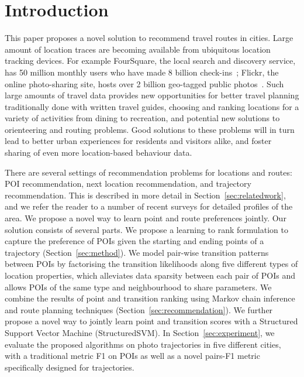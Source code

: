 
\section{Introduction}
\label{sec:intro}

This paper proposes a novel solution to recommend travel routes in cities.
Large amount of location traces are becoming available from ubiquitous location tracking devices.
For example FourSquare, the local search and discovery service, has 50 million monthly users who have made 8 billion check-ins~\cite{4sq}; Flickr, the online photo-sharing site, hosts over 2 billion geo-tagged public photos~\cite{flickr}. Such large amounts of travel data provides new opportunities for better
travel planning traditionally done with written travel guides,
choosing and ranking locations for a variety of activities from dining to recreation,
and potential new solutions to orienteering and routing problems.
Good solutions to these problems will in turn lead to better urban experiences for residents and visitors alike, and foster sharing of even more location-based behaviour data.

There are several settings of recommendation problems for locations and routes: POI recommendation,
next location recommendation, and trajectory recommendation. This is described in more detail in
Section~\ref{sec:relatedwork}, and we refer the reader to a number of recent
surveys\cite{bao2015recommendations,zheng2015trajectory,zheng2014urban}
for detailed profiles of the area.
We propose a novel way to learn point and route preferences jointly.
Our solution consists of several parts.
We propose a learning to rank formulation to capture the preference of POIs given the starting and ending points of a trajectory (Section~\ref{sec:method}).
We model pair-wise transition patterns between POIs by factorising the transition likelihoods along five different types of location properties,
which alleviates data sparsity between each pair of POIs and allows POIs of the same type and neighbourhood to share parameters.
We combine the results of point and transition ranking using Markov chain inference and route planning techniques (Section~\ref{sec:recommendation}). We further propose a novel way to jointly learn point and transition scores with a Structured Support Vector Machine (StructuredSVM). In Section~\ref{sec:experiment},
we evaluate the proposed algorithms on photo trajectories in five different cities, with a traditional metric F1 on POIs as well as a novel pairs-F1 metric specifically designed for trajectories.

